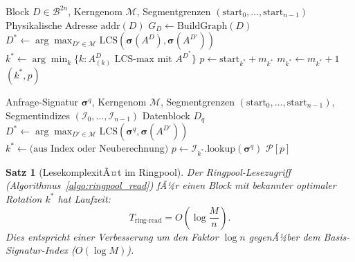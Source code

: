 ﻿\documentclass[a4paper,12pt]{article}
\theoremstyle{definition}
\theoremstyle{plain}
\newtheorem{satz}{Satz}[section]
\begin{document}
\begin{algorithm}[H]
\caption{Ringpool-Indexierung (Schreiben)}
\label{algo:ringpool_write}
\begin{algorithmic}[1]
\Require Block $D \in \mathcal{B}^{2n}$, Kerngenom $\mathcal{M}$,
         Segmentgrenzen $(\mathrm{start}_0, \ldots, \mathrm{start}_{n-1})$
\Ensure Physikalische Adresse $\mathrm{addr}(D)$
\State $G_D \gets \mathrm{BuildGraph}(D)$
\State $D^* \gets \arg\max_{D' \in \mathcal{M}}
  \mathrm{LCS}(\boldsymbol{\sigma}(A^D), \boldsymbol{\sigma}(A^{D'}))$
\State $k^* \gets \arg\min_k \{k : A^D_{(k)} \text{ LCS-max mit } A^{D^*}\}$
\State $p \gets \mathrm{start}_{k^*} + m_{k^*}$
\State $m_{k^*} \gets m_{k^*} + 1$
\State \Return $(k^*, p)$
\end{algorithmic}
\end{algorithm}

\begin{algorithm}[H]
\caption{Ringpool-Lesezugriff (Lesen)}
\label{algo:ringpool_read}
\begin{algorithmic}[1]
\Require Anfrage-Signatur $\boldsymbol{\sigma}^q$, Kerngenom $\mathcal{M}$,
         Segmentgrenzen $(\mathrm{start}_0, \ldots, \mathrm{start}_{n-1})$,
         Segmentindizes $(\mathcal{I}_0, \ldots, \mathcal{I}_{n-1})$
\Ensure Datenblock $D_q$
\State $D^* \gets \arg\max_{D' \in \mathcal{M}}
  \mathrm{LCS}(\boldsymbol{\sigma}^q, \boldsymbol{\sigma}(A^{D'}))$
\State $k^* \gets \text{(aus Index oder Neuberechnung)}$
\State $p \gets \mathcal{I}_{k^*}.\mathrm{lookup}(\boldsymbol{\sigma}^q)$
\State \Return $\mathcal{P}[p]$
\end{algorithmic}
\end{algorithm}

\begin{satz}[LesekomplexitÃ¤t im Ringpool]
\label{satz:ringpool_lesen}
  Der Ringpool-Lesezugriff (Algorithmus~\ref{algo:ringpool_read}) fÃ¼r
  einen Block mit bekannter optimaler Rotation $k^*$ hat Laufzeit:
  \[
    T_{\mathrm{ring\text{-}read}} = O\!\left(\log\frac{M}{n}\right).
  \]
  Dies entspricht einer Verbesserung um den Faktor $\log n$ gegenÃ¼ber
  dem Basis-Signatur-Index ($O(\log M)$).
\end{satz}
\end{document}
